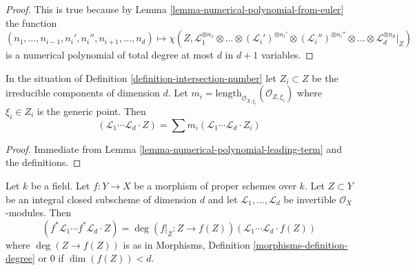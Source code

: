 \begin{proof}
This is true because by Lemma \ref{lemma-numerical-polynomial-from-euler}
the function
$$
(n_1, \ldots, n_{i - 1}, n_i', n_i'', n_{i + 1}, \ldots, n_d)
\mapsto
\chi(Z, \mathcal{L}_1^{\otimes n_1} \otimes
\ldots \otimes (\mathcal{L}_i')^{\otimes n_i'} \otimes
(\mathcal{L}_i'')^{\otimes n_i''} \otimes \ldots \otimes
\mathcal{L}_d^{\otimes n_d}|_Z)
$$
is a numerical polynomial of total degree at most $d$ in $d + 1$ variables.
\end{proof}

\begin{lemma}
\label{lemma-intersection-number-in-terms-of-components}
In the situation of Definition \ref{definition-intersection-number}
let $Z_i \subset Z$ be the irreducible components of dimension $d$. Let
$m_i = \text{length}_{\mathcal{O}_{X, \xi_i}}(\mathcal{O}_{Z, \xi_i})$
where $\xi_i \in Z_i$ is the generic point. Then
$$
(\mathcal{L}_1 \cdots \mathcal{L}_d \cdot Z) =
\sum m_i(\mathcal{L}_1 \cdots \mathcal{L}_d \cdot Z_i)
$$
\end{lemma}

\begin{proof}
Immediate from Lemma \ref{lemma-numerical-polynomial-leading-term}
and the definitions.
\end{proof}

\begin{lemma}
\label{lemma-intersection-number-and-pullback}
Let $k$ be a field. Let $f : Y \to X$ be a morphism of proper schemes over $k$.
Let $Z \subset Y$ be an integral closed subscheme of dimension $d$ and let
$\mathcal{L}_1, \ldots, \mathcal{L}_d$ be invertible $\mathcal{O}_X$-modules.
Then
$$
(f^*\mathcal{L}_1 \cdots f^*\mathcal{L}_d \cdot Z) =
\deg(f|_Z : Z \to f(Z)) (\mathcal{L}_1 \cdots \mathcal{L}_d \cdot f(Z))
$$
where $\deg(Z \to f(Z))$ is as in
Morphisms, Definition \ref{morphisms-definition-degree}
or $0$ if $\dim(f(Z)) < d$.
\end{lemma}

